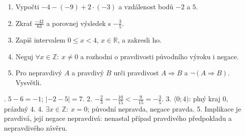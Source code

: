 \documentclass[11pt,a4paper]{article}
\begin{document}

\begin{zadaniReseniBox}[title={Domácí úkol},breakable=false]
\begin{enumerate}[label=\arabic*)]
\item Vypočti $-4-(-9)+2\cdot(-3)$ a vzdálenost bodů $-2$ a $5$.
\item Zkrať $\frac{-42}{63}$ a porovnej výsledek s $-\frac35$.
\item Zapiš intervalem $0\le x<4$, $x\in\mathbb R$, a zakresli ho.
\item Neguj $\forall x\in\mathbb Z:\ x\ne0$ a rozhodni o pravdivosti
původního výroku i negace.
\item Pro nepravdivý $A$ a pravdivý $B$ urči pravdivost
$A\Rightarrow B$ a $\neg(A\Rightarrow B)$. Vysvětli.
\end{enumerate}
. $5-6=-1$; $|-2-5|=7$.
2. $-\frac23=-\frac{10}{15}<-\frac9{15}=-\frac35$.
3. $\langle0;4)$: plný kraj $0$, prázdný $4$.
4. $\exists x\in\mathbb Z:\ x=0$; původní nepravda, negace pravda.
5. Implikace je pravdivá, její negace nepravdivá:
nenastal případ pravdivého předpokladu a nepravdivého závěru.
\end{zadaniReseniBox}
\end{document}
